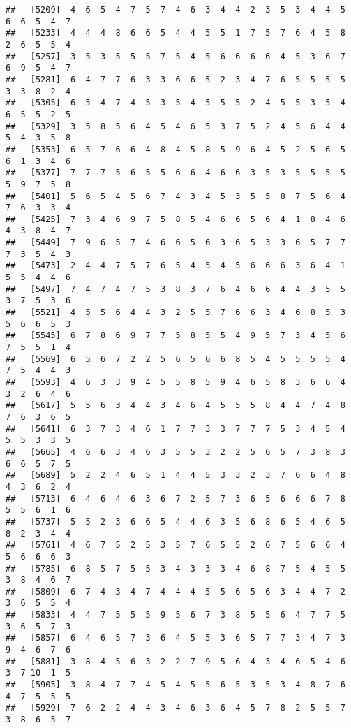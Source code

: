 \documentclass[
]{book}
\begin{document}
\begin{verbatim}
##   [5209]  4  6  5  4  7  5  7  4  6  3  4  4  2  3  5  3  4  4  5  6  6  5  4  7
##   [5233]  4  4  4  8  6  6  5  4  4  5  5  1  7  5  7  6  4  5  8  2  6  5  5  4
##   [5257]  3  5  3  5  5  5  7  5  4  5  6  6  6  6  4  5  3  6  7  6  9  5  4  7
##   [5281]  6  4  7  7  6  3  3  6  6  5  2  3  4  7  6  5  5  5  5  3  3  8  2  4
##   [5305]  6  5  4  7  4  5  3  5  4  5  5  5  2  4  5  5  3  5  4  6  5  5  2  5
##   [5329]  3  5  8  5  6  4  5  4  6  5  3  7  5  2  4  5  6  4  4  5  4  3  5  8
##   [5353]  6  5  7  6  6  4  8  4  5  8  5  9  6  4  5  2  5  6  5  6  1  3  4  6
##   [5377]  7  7  7  5  6  5  5  6  6  4  6  6  3  5  3  5  5  5  5  5  9  7  5  8
##   [5401]  5  6  5  4  5  6  7  4  3  4  5  3  5  5  8  7  5  6  4  7  6  3  3  4
##   [5425]  7  3  4  6  9  7  5  8  5  4  6  6  5  6  4  1  8  4  6  4  3  8  4  7
##   [5449]  7  9  6  5  7  4  6  6  5  6  3  6  5  3  3  6  5  7  7  7  3  5  4  3
##   [5473]  2  4  4  7  5  7  6  5  4  5  4  5  6  6  6  3  6  4  1  5  5  4  4  6
##   [5497]  7  4  7  4  7  5  3  8  3  7  6  4  6  6  4  4  3  5  5  3  7  5  3  6
##   [5521]  4  5  5  6  4  4  3  2  5  5  7  6  6  3  4  6  8  5  3  5  6  6  5  3
##   [5545]  6  7  8  6  9  7  7  5  8  5  5  4  9  5  7  3  4  5  6  7  5  5  1  4
##   [5569]  6  5  6  7  2  2  5  6  5  6  6  8  5  4  5  5  5  5  4  7  5  4  4  3
##   [5593]  4  6  3  3  9  4  5  5  8  5  9  4  6  5  8  3  6  6  4  3  2  6  4  6
##   [5617]  5  5  6  3  4  4  3  4  6  4  5  5  5  8  4  4  7  4  8  7  6  3  6  5
##   [5641]  6  3  7  3  4  6  1  7  7  3  3  7  7  7  5  3  4  5  4  5  5  3  3  5
##   [5665]  4  6  6  3  4  6  3  5  5  3  2  2  5  6  5  7  3  8  3  6  6  5  7  5
##   [5689]  5  2  2  4  6  5  1  4  4  5  3  3  2  3  7  6  6  4  8  4  3  6  2  4
##   [5713]  6  4  6  4  6  3  6  7  2  5  7  3  6  5  6  6  6  7  8  5  5  6  1  6
##   [5737]  5  5  2  3  6  6  5  4  4  6  3  5  6  8  6  5  4  6  5  8  2  3  4  4
##   [5761]  4  6  7  5  2  5  3  5  7  6  5  5  2  6  7  5  6  6  4  5  6  6  6  3
##   [5785]  6  8  5  7  5  5  3  4  3  3  3  4  6  8  7  5  4  5  5  3  8  4  6  7
##   [5809]  6  7  4  3  4  7  4  4  4  5  5  6  5  6  3  4  4  7  2  3  6  5  5  4
##   [5833]  4  4  7  5  5  5  9  5  6  7  3  8  5  5  6  4  7  7  5  3  6  5  7  3
##   [5857]  6  4  6  5  7  3  6  4  5  5  3  6  5  7  7  3  4  7  3  9  4  6  7  6
##   [5881]  3  8  4  5  6  3  2  2  7  9  5  6  4  3  4  6  5  4  6  3  7 10  1  5
##   [5905]  3  8  4  7  7  4  5  4  5  5  6  5  3  5  3  4  8  7  6  4  7  5  5  5
##   [5929]  7  6  2  2  4  4  3  4  6  3  6  4  5  7  8  2  5  5  7  3  8  6  5  7

\end{verbatim}
\end{document}
